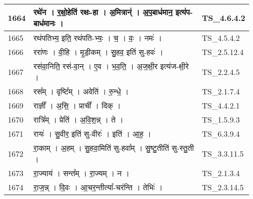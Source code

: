 \documentclass[17pt]{extarticle}
\begin{document}
\begin{longtable}{||p{0.4in}||p{4.9in}||p{0.9in}||}
    \hline
        
    1664 & रथे॑न   ।   र॒क्षो॒हेति॑ रक्षः{-}हा   ।   अ॒मित्रान्॑   ।   अ॒प॒बाध॑मान॒ इत्य॑प{-}बाध॑मानः   ।    & TS\_4.6.4.2       \\
    
    \hline
        
    1665 & रथ॑पतिभ्य॒ इति॒ रथ॑पति{-}भ्यः॒   ।   च॒   ।   वः॒   ।   नमः॑   ।    & TS\_4.5.4.2       \\
    
    \hline
        
    1666 & ररा॑णः   ।   वी॒हि   ।   मृ॒डी॒कम्   ।   सु॒हव॒ इति॑ सु{-}हवः॑   ।    & TS\_2.5.12.4       \\
    
    \hline
        
    1667 & रस॑वा॒निति॒ रस॑{-}वा॒न्   ।   ए॒व   ।   भ॒व॒ति॒   ।   अ॒ज॒क्षी॒र इत्य॑ज{-}क्षी॒रे   ।    & TS\_2.2.4.5       \\
    
    \hline
        
    1668 & रस᳚म्   ।   वृष्टि᳚म्   ।   अवेति॑   ।   रु॒न्धे॒   ।    & TS\_2.1.7.4       \\
    
    \hline
        
    1669 & राज्ञी᳚   ।   अ॒सि॒   ।   प्राची᳚   ।   दिक्   ।    & TS\_4.4.2.1       \\
    
    \hline
        
    1670 & रात्रि᳚म्   ।   प्रेति॑   ।   अ॒वि॒श॒न्न्   ।   ते   ।    & TS\_1.5.9.3       \\
    
    \hline
        
    1671 & रायः॑   ।   सु॒वीर॒ इति॑ सु{-}वीरः॑   ।   इति॑   ।   आ॒ह॒   ।    & TS\_6.3.9.4       \\
    
    \hline
        
    1672 & रा॒काम्   ।   अ॒हम्   ।   सु॒हवा॒मिति॑ सु{-}हवा᳚म्   ।   सु॒ष्टु॒तीति॑ सु{-}स्तु॒ती   ।    & TS\_3.3.11.5       \\
    
    \hline
        
    1673 & रा॒ज्याय॑   ।   सन्त᳚म्   ।   रा॒ज्यम्   ।   न   ।    & TS\_2.1.3.4       \\
    
    \hline
        
    1674 & रा॒ज॒न्न्   ।   दि॒वः   ।   आ॒चर॒न्तीत्या᳚{-}चर॑न्ति   ।   तेभिः॑   ।    & TS\_2.3.14.5       \\
    

\end{longtable}
\end{document}
